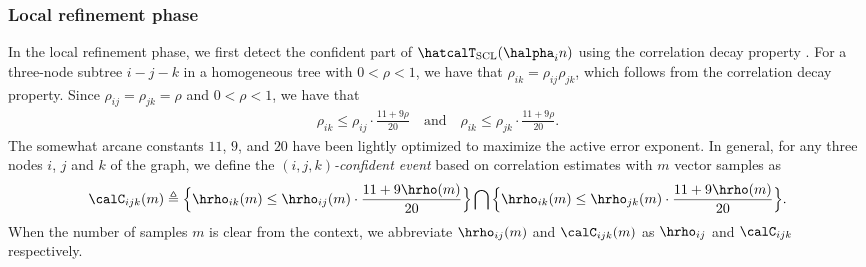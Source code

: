 \documentclass[11pt,onecolumn]{article}
\begin{document}
\subsubsection{Local refinement phase}
In the local refinement phase,  we first detect the confident part of $\hatcalT_{\rm{SCL}}(\halpha_{i}n)$ using the correlation decay property \cite{nikolakakis2021predictive}.  
For a three-node subtree $i-j-k$ in a homogeneous tree with $0<\rho<1$, we have that $\rho_{ik}=\rho_{ij}\rho_{jk}$, which follows from the correlation decay property. Since $\rho_{ij}=\rho_{jk}=\rho$ and $0<\rho<1$, we have that
\begin{align}
	\rho_{ik}\leq \rho_{ij}\cdot\frac{11+9\rho}{20}  \quad\mbox{and}\quad \rho_{ik}\leq \rho_{jk}\cdot\frac{ 11+9\rho}{20}.
\end{align}
The somewhat arcane constants $11$, $9$, and $20$ have been lightly optimized to maximize the active error exponent. In general, for any three nodes $i$, $j$ and $k$ of the graph, we define the \emph{$(i,j,k)$-confident event} 
based on correlation estimates with $m$ vector samples as
\begin{align}\label{eq:confevent}
	\calC_{ijk}(m)\triangleq\Big\{\hrho_{ik}(m)\leq \hrho_{ij}(m)\cdot\frac{11+9\hrho(m)}{20}\Big\}\bigcap\Big\{\hrho_{ik}(m)\leq \hrho_{jk}(m)\cdot\frac{11+9\hrho(m)}{20}\Big\}.
\end{align}
When the number of samples $m$ is clear from the context, we abbreviate   $\hrho_{ij}(m)$ and $\calC_{ijk}(m)$ as $\hrho_{ij}$ and $\calC_{ijk}$ respectively.
\end{document}
